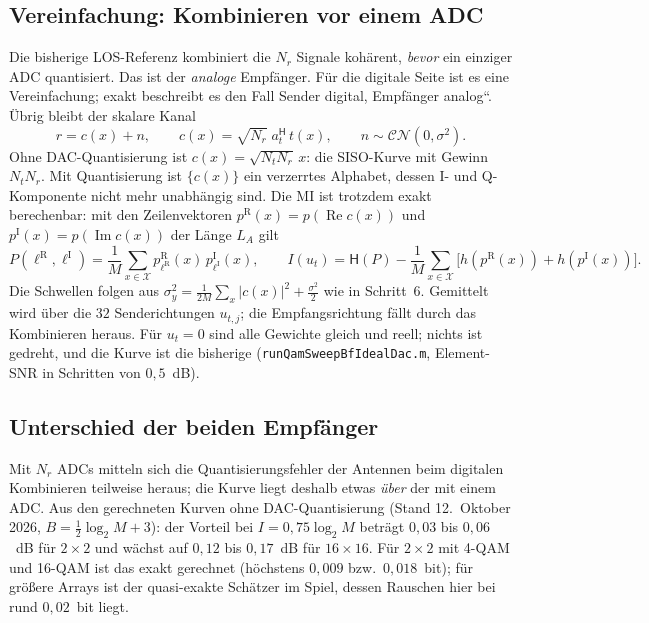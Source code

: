 \documentclass[11pt,a4paper]{article}
\newcommand{\re}{\operatorname{Re}}
\newcommand{\im}{\operatorname{Im}}
\newcommand{\file}[1]{\texttt{#1}}
\begin{document}
\subsection{Vereinfachung: Kombinieren vor einem ADC}\label{sec:los1}

Die bisherige LOS-Referenz kombiniert die $N_r$ Signale kohärent, \emph{bevor} ein einziger ADC
quantisiert. Das ist der \emph{analoge} Empfänger. Für die digitale Seite ist es eine
Vereinfachung; exakt beschreibt es den Fall \quotedblbase  Sender digital, Empfänger analog\textquotedblleft.
Übrig bleibt der skalare Kanal
\begin{equation}
r=c(x)+n,\qquad c(x)=\sqrt{N_r}\;a_t^{\mathsf H}\,t(x),\qquad n\sim\mathcal{CN}(0,\sigma^2).
\end{equation}
Ohne DAC-Quantisierung ist $c(x)=\sqrt{N_tN_r}\,x$: die SISO-Kurve mit Gewinn $N_tN_r$. Mit
Quantisierung ist $\{c(x)\}$ ein verzerrtes Alphabet, dessen I- und Q-Komponente nicht mehr
unabhängig sind. Die MI ist trotzdem exakt berechenbar: mit den Zeilenvektoren
$p^{\mathrm R}(x)=p(\re c(x))$ und $p^{\mathrm I}(x)=p(\im c(x))$ der Länge $L_A$ gilt
\begin{equation}
P(\ell^{\mathrm R},\ell^{\mathrm I})=\frac1M\sum_{x\in\mathcal X}p^{\mathrm R}_{\ell^{\mathrm R}}(x)\,p^{\mathrm I}_{\ell^{\mathrm I}}(x),\qquad
I(u_t)=\mathsf H(P)-\frac1M\sum_{x\in\mathcal X}\bigl[h(p^{\mathrm R}(x))+h(p^{\mathrm I}(x))\bigr].
\end{equation}
Die Schwellen folgen aus $\sigma_y^2=\tfrac{1}{2M}\sum_x|c(x)|^2+\tfrac{\sigma^2}{2}$ wie in Schritt~6.
Gemittelt wird über die $32$ Senderichtungen $u_{t,j}$; die Empfangsrichtung fällt durch das
Kombinieren heraus. Für $u_t=0$ sind alle Gewichte gleich und reell; nichts ist gedreht, und die
Kurve ist die bisherige (\file{runQamSweepBfIdealDac.m}, Element-SNR in Schritten von $0{,}5$~dB).

\subsection{Unterschied der beiden Empfänger}

Mit $N_r$ ADCs mitteln sich die Quantisierungsfehler der Antennen beim digitalen Kombinieren
teilweise heraus; die Kurve liegt deshalb etwas \emph{über} der mit einem ADC. Aus den gerechneten
Kurven ohne DAC-Quantisierung (Stand 12.~Oktober 2026, $B=\tfrac12\log_2M+3$): der Vorteil bei
$I=0{,}75\log_2M$ beträgt $0{,}03$ bis $0{,}06$~dB für $2\times2$ und wächst auf $0{,}12$ bis
$0{,}17$~dB für $16\times16$. Für $2\times2$ mit 4-QAM und 16-QAM ist das exakt gerechnet
(höchstens $0{,}009$ bzw.\ $0{,}018$~bit); für größere Arrays ist der quasi-exakte Schätzer im
Spiel, dessen Rauschen hier bei rund $0{,}02$~bit liegt.
\end{document}
